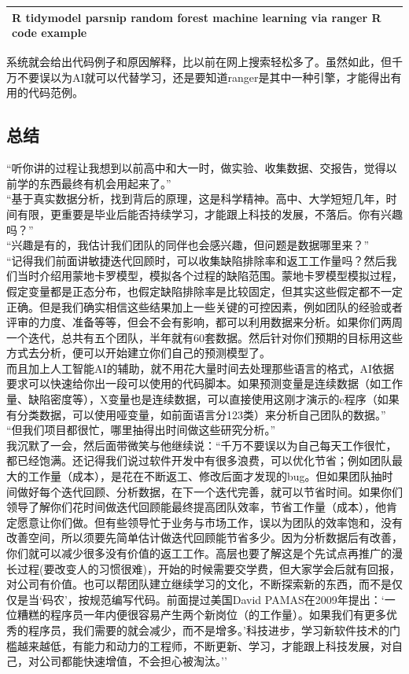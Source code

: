 \begin{longtable}[]{@{}l@{}}
\toprule
\endhead
R tidymodel parsnip random forest machine learning via ranger R code
example\tabularnewline
\bottomrule
\end{longtable}

系统就会给出代码例子和原因解释，比以前在网上搜索轻松多了。虽然如此，但千万不要误以为AI就可以代替学习，还是要知道ranger是其中一种引擎，才能得出有用的代码范例。

\hypertarget{ux603bux7ed3}{%
\subsection{总结}\label{ux603bux7ed3}}

``听你讲的过程让我想到以前高中和大一时，做实验、收集数据、交报告，觉得以前学的东西最终有机会用起来了。''\\
``基于真实数据分析，找到背后的原理，这是科学精神。高中、大学短短几年，时间有限，更重要是毕业后能否持续学习，才能跟上科技的发展，不落后。你有兴趣吗？''\\
``兴趣是有的，我估计我们团队的同伴也会感兴趣，但问题是数据哪里来？''\\
``记得我们前面讲敏捷迭代回顾时，可以收集缺陷排除率和返工工作量吗？然后我们当时介绍用蒙地卡罗模型，模拟各个过程的缺陷范围。蒙地卡罗模型模拟过程，假定变量都是正态分布，也假定缺陷排除率是比较固定，但其实这些假定都不一定正确。但是我们确实相信这些结果加上一些关键的可控因素，例如团队的经验或者评审的力度、准备等等，但会不会有影响，都可以利用数据来分析。如果你们两周一个迭代，总共有五个团队，半年就有60套数据。然后针对你们预期的目标用这些方式去分析，便可以开始建立你们自己的预测模型了。\\
而且加上人工智能AI的辅助，就不用花大量时间去处理那些语言的格式，AI依据要求可以快速给你出一段可以使用的代码脚本。如果预测变量是连续数据（如工作量、缺陷密度等），X变量也是连续数据，可以直接使用这刚才演示的c程序（如果有分类数据，可以使用哑变量，如前面语言分123类）来分析自己团队的数据。''\\
``但我们项目都很忙，哪里抽得出时间做这些研究分析。''\\
我沉默了一会，然后面带微笑与他继续说：``千万不要误以为自己每天工作很忙，都已经饱满。还记得我们说过软件开发中有很多浪费，可以优化节省；例如团队最大的工作量（成本），是花在不断返工、修改后面才发现的bug。但如果团队抽时间做好每个迭代回顾、分析数据，在下一个迭代完善，就可以节省时间。如果你们领导了解你们花时间做迭代回顾能最终提高团队效率，节省工作量（成本），他肯定愿意让你们做。但有些领导忙于业务与市场工作，误以为团队的效率饱和，没有改善空间，所以须要先简单估计做迭代回顾能节省多少。因为分析数据后有改善，你们就可以减少很多没有价值的返工工作。高层也要了解这是个先试点再推广的漫长过程(要改变人的习惯很难)，开始的时候需要交学费，但大家学会后就有回报，对公司有价值。也可以帮团队建立继续学习的文化，不断探索新的东西，而不是仅仅是当`码农'，按规范编写代码。前面提过美国David
PAMAS在2009年提出：`一位糟糕的程序员一年内便很容易产生两个新岗位（的工作量）。如果我们有更多优秀的程序员，我们需要的就会减少，而不是增多。'科技进步，学习新软件技术的门槛越来越低，有能力和动力的工程师，不断更新、学习，才能跟上科技发展，对自己，对公司都能快速增值，不会担心被淘汰。''

